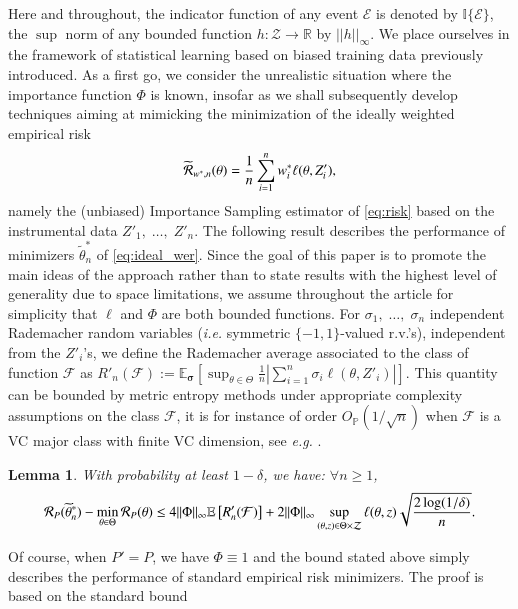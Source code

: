 \documentclass[12pt]{article}
\newtheorem{lemma}{{\bf Lemma}}
\newcommand{\E}[0]{\mathbb{E}}
\newcommand{\cR}{{\cal R}}
\def\E{\mathbb E}
\begin{document}
Here and throughout, the indicator function of any event $\mathcal{E}$ is denoted by $\mathbb{I}\{\mathcal{E}\}$, the $\sup$ norm of any bounded function $h:\mathcal{Z}\rightarrow \mathbb{R}$ by $\vert\vert h\vert\vert_{\infty}$.
We place ourselves in the framework of statistical learning based on biased training data previously introduced. As a first go, we consider the unrealistic situation where the importance function $\Phi$ is known, insofar as we shall subsequently develop techniques aiming at mimicking the minimization of the ideally weighted empirical risk
\begin{equation}\label{eq:ideal_wer}
\widetilde{\cR}_{w^*,n}(\theta)=\frac{1}{n} \sum_{i=1}^n w_i^* \ell(\theta, Z_i'),
\end{equation}
namely the (unbiased) Importance Sampling estimator of \eqref{eq:risk} based on the instrumental data $Z'_1,\; \ldots,\; Z'_n$. The following result describes the performance of minimizers $\widetilde{\theta}^*_n$ of \eqref{eq:ideal_wer}. Since the goal of this paper is to promote the main ideas of the approach rather than to state results with the highest level of generality due to space limitations, we assume throughout the article for simplicity that $\ell$ and $\Phi$ are both bounded functions. For $\sigma_1,\; \ldots,\; \sigma_n$ independent Rademacher
random variables (\textit{i.e.} symmetric $\{ -1,1 \}$-valued r.v.'s), independent from the $Z'_i$'s, we define the Rademacher average associated to the class of function $\mathcal{F}$ as
$
R'_n(\mathcal{F}):=\mathbb{E}_{\mathbf{\sigma}}\left[\sup_{\theta\in \Theta}\frac{1}{n}\left\vert \sum_{i=1}^n\sigma_i \ell(\theta,Z'_i) \right\vert\right].
$
This quantity can be bounded by metric entropy methods under appropriate complexity assumptions on the class $\mathcal{F}$, it is for instance of order $O_{\mathbb{P}}(1/\sqrt{n})$ when $\mathcal{F}$ is a {\sc VC} major class with finite {\sc VC} dimension, see \textit{e.g.} \cite{Boucheron2005}.
\begin{lemma}\label{ERM1}
With probability at least $1-\delta$, we have: $\forall n\geq 1$,
\begin{equation*}
    \cR_P (\widetilde{\theta}^*_n) - \min_{\theta\in \Theta}\cR_P(\theta) \le
    4\vert\vert \Phi\vert\vert_{\infty} \E \left[R'_n(\mathcal{F})\right]
    + 2\vert\vert \Phi\vert\vert_{\infty}\sup_{(\theta,z)\in \Theta\times \mathcal{Z}} \ell(\theta, z) \sqrt{\frac{2 \log (1/\delta)}{n}}.
\end{equation*}
\end{lemma}
Of course, when $P'=P$, we have $\Phi\equiv 1$ and the bound stated above simply describes the performance of standard empirical risk minimizers. The proof is based on the standard bound
\end{document}
